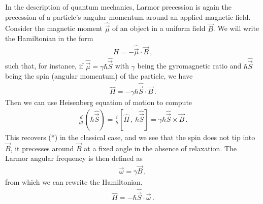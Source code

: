 \documentclass[11pt]{article}
\begin{document}
In the description of quantum mechanics, Larmor precession is again the precession of a particle's angular momentum around an applied magnetic field. Consider the magnetic moment $\hat{\vec{\mu}}$ of an object in a uniform field $\vec{B}$. We will write the Hamiltonian in the form 
\begin{align*}
H = -\hat{\vec{\mu}}\cdot \vec{B}\,,
\end{align*}
such that, for instance, if $\hat{\vec{\mu}} = \gamma \hbar\hat{\vec{S}}$ with $\gamma$ being the gyromagnetic ratio and $\hbar\hat{\vec{S}}$ being the spin (angular momentum) of the particle, we have
\begin{align*}
\hat{H} = -\gamma \hbar\hat{\vec{S}}\cdot \vec{B}\,.
\end{align*} 
Then we can use Heisenberg equation of motion to compute
\begin{align*}
\frac{d}{dt}(\hbar\hat{\vec{S}}) = \frac{i}{\hbar}[\hat{H}\,,\, \hbar\hat{\vec{S}}] = \gamma\hbar\hat{\vec{S}}\times \vec{B}\,.
\end{align*}
This recovers (*) in the classical case, and we see that the spin does not tip into $\vec{B}$, it precesses around $\vec{B}$ at a fixed angle in the absence of relaxation. The Larmor angular frequency is then defined as
\begin{align*}
\vec{\omega} = \gamma\vec{B}\,,
\end{align*}
from which we can rewrite the Hamiltonian,
\begin{align*}
\hat{H} = -\hbar \hat{\vec{S}} \cdot \vec{\omega}\,.
\end{align*}
\end{document}
